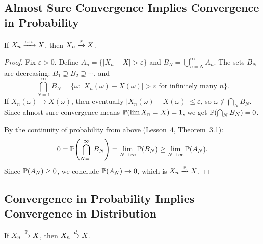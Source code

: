 \documentclass[11pt,a4paper]{article}
\begin{document}
\subsection{Almost Sure Convergence Implies Convergence in Probability}
\label{subsec:as_to_prob}

\begin{theorem}
\label{thm:as_to_prob}
If $X_n \xrightarrow{\text{a.s.}} X$, then $X_n \xrightarrow{\mathbb{P}} X$.
\end{theorem}

\begin{proof}
Fix $\varepsilon > 0$.  Define
$A_n = \{|X_n - X| > \varepsilon\}$ and
$B_N = \bigcup_{n=N}^\infty A_n$.  The sets $B_N$ are decreasing:
$B_1 \supseteq B_2 \supseteq \cdots$, and
\begin{equation}
  \bigcap_{N=1}^\infty B_N
  = \{\omega : |X_n(\omega) - X(\omega)| > \varepsilon
      \text{ for infinitely many } n\}.
\end{equation}
If $X_n(\omega) \to X(\omega)$, then eventually
$|X_n(\omega) - X(\omega)| \leq \varepsilon$, so
$\omega \notin \bigcap_N B_N$.  Since almost sure convergence
means $\mathbb{P}(\lim X_n = X) = 1$, we get
$\mathbb{P}(\bigcap_N B_N) = 0$.

By the continuity of probability from above
(Lesson~4, Theorem~3.1):
\begin{equation}
  0 = \mathbb{P}\!\left(\bigcap_{N=1}^\infty B_N\right)
  = \lim_{N \to \infty} \mathbb{P}(B_N)
  \geq \lim_{N \to \infty} \mathbb{P}(A_N).
\end{equation}
Since $\mathbb{P}(A_N) \geq 0$, we conclude $\mathbb{P}(A_N) \to 0$,
which is $X_n \xrightarrow{\mathbb{P}} X$.
\end{proof}

\subsection{Convergence in Probability Implies Convergence in Distribution}
\label{subsec:prob_to_dist}

\begin{theorem}
\label{thm:prob_to_dist}
If $X_n \xrightarrow{\mathbb{P}} X$, then $X_n \xrightarrow{d} X$.
\end{theorem}
\end{document}

